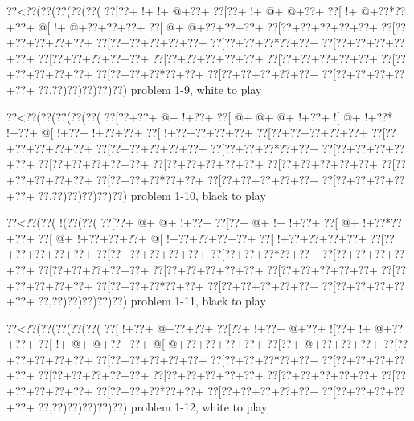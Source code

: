\vbox{\vbox{\goo
\0??<\0??(\0??(\0??(\0??(\0??(
\0??[\0??+\- !+\- !+\- @+\0??+
\0??[\0??+\- !+\- @+\- @+\0??+
\0??[\- !+\- @+\0??*\0??+\0??+
\- @[\- !+\- @+\0??+\0??+\0??+
\0??[\- @+\- @+\0??+\0??+\0??+
\0??[\0??+\0??+\0??+\0??+\0??+
\0??[\0??+\0??+\0??+\0??+\0??+
\0??[\0??+\0??+\0??+\0??+\0??+
\0??[\0??+\0??+\0??*\0??+\0??+
\0??[\0??+\0??+\0??+\0??+\0??+
\0??[\0??+\0??+\0??+\0??+\0??+
\0??[\0??+\0??+\0??+\0??+\0??+
\0??[\0??+\0??+\0??+\0??+\0??+
\0??[\0??+\0??+\0??+\0??+\0??+
\0??[\0??+\0??+\0??*\0??+\0??+
\0??[\0??+\0??+\0??+\0??+\0??+
\0??[\0??+\0??+\0??+\0??+\0??+
\0??,\0??)\0??)\0??)\0??)\0??)
}
\hfil problem 1-9, white to play\hfil\break
}

\vbox{\vbox{\goo
\0??<\0??(\0??(\0??(\0??(\0??(
\0??[\0??+\0??+\- @+\- !+\0??+
\0??[\- @+\- @+\- @+\- !+\0??+
\- ![\- @+\- !+\0??*\- !+\0??+
\- @[\- !+\0??+\- !+\0??+\0??+
\0??[\- !+\0??+\0??+\0??+\0??+
\0??[\0??+\0??+\0??+\0??+\0??+
\0??[\0??+\0??+\0??+\0??+\0??+
\0??[\0??+\0??+\0??+\0??+\0??+
\0??[\0??+\0??+\0??*\0??+\0??+
\0??[\0??+\0??+\0??+\0??+\0??+
\0??[\0??+\0??+\0??+\0??+\0??+
\0??[\0??+\0??+\0??+\0??+\0??+
\0??[\0??+\0??+\0??+\0??+\0??+
\0??[\0??+\0??+\0??+\0??+\0??+
\0??[\0??+\0??+\0??*\0??+\0??+
\0??[\0??+\0??+\0??+\0??+\0??+
\0??[\0??+\0??+\0??+\0??+\0??+
\0??,\0??)\0??)\0??)\0??)\0??)
}
\hfil problem 1-10, black to play\hfil\break
}

\vbox{\vbox{\goo
\0??<\0??(\0??(\- !(\0??(\0??(
\0??[\0??+\- @+\- @+\- !+\0??+
\0??[\0??+\- @+\- !+\- !+\0??+
\0??[\- @+\- !+\0??*\0??+\0??+
\0??[\- @+\- !+\0??+\0??+\0??+
\- @[\- !+\0??+\0??+\0??+\0??+
\0??[\- !+\0??+\0??+\0??+\0??+
\0??[\0??+\0??+\0??+\0??+\0??+
\0??[\0??+\0??+\0??+\0??+\0??+
\0??[\0??+\0??+\0??*\0??+\0??+
\0??[\0??+\0??+\0??+\0??+\0??+
\0??[\0??+\0??+\0??+\0??+\0??+
\0??[\0??+\0??+\0??+\0??+\0??+
\0??[\0??+\0??+\0??+\0??+\0??+
\0??[\0??+\0??+\0??+\0??+\0??+
\0??[\0??+\0??+\0??*\0??+\0??+
\0??[\0??+\0??+\0??+\0??+\0??+
\0??[\0??+\0??+\0??+\0??+\0??+
\0??,\0??)\0??)\0??)\0??)\0??)
}
\hfil problem 1-11, black to play\hfil\break
}

\vbox{\vbox{\goo
\0??<\0??(\0??(\0??(\0??(\0??(
\0??[\- !+\0??+\- @+\0??+\0??+
\0??[\0??+\- !+\0??+\- @+\0??+
\- ![\0??+\- !+\- @+\0??+\0??+
\0??[\- !+\- @+\- @+\0??+\0??+
\- @[\- @+\0??+\0??+\0??+\0??+
\0??[\0??+\- @+\0??+\0??+\0??+
\0??[\0??+\0??+\0??+\0??+\0??+
\0??[\0??+\0??+\0??+\0??+\0??+
\0??[\0??+\0??+\0??*\0??+\0??+
\0??[\0??+\0??+\0??+\0??+\0??+
\0??[\0??+\0??+\0??+\0??+\0??+
\0??[\0??+\0??+\0??+\0??+\0??+
\0??[\0??+\0??+\0??+\0??+\0??+
\0??[\0??+\0??+\0??+\0??+\0??+
\0??[\0??+\0??+\0??*\0??+\0??+
\0??[\0??+\0??+\0??+\0??+\0??+
\0??[\0??+\0??+\0??+\0??+\0??+
\0??,\0??)\0??)\0??)\0??)\0??)
}
\hfil problem 1-12, white to play\hfil\break
}

